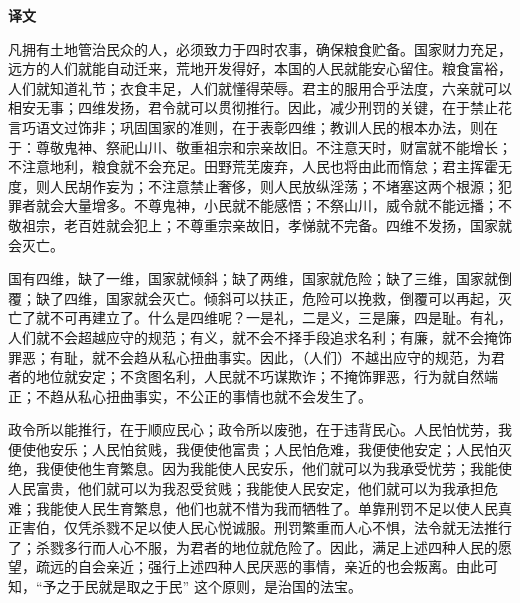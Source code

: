 \documentclass[12pt,UTF-8,openany,a4]{ctexbook}
\begin{document}
\newpage

\begin{Large}
    \noindent\textbf{译文}
\end{Large}


\vspace{1em}

\begin{large}
    \yiwen 
    凡拥有土地管治民众的人，必须致力于四时农事，确保粮食贮备。国家财力充足，远方的人们就能自动迁来，荒地开发得好，本国的人民就能安心留住。粮食富裕，人们就知道礼节；衣食丰足，人们就懂得荣辱。君主的服用合乎法度，六亲就可以相安无事；四维发扬，君令就可以贯彻推行。因此，减少刑罚的关键，在于禁止花言巧语文过饰非；巩固国家的准则，在于表彰四维；教训人民的根本办法，则在于：尊敬鬼神、祭祀山川、敬重祖宗和宗亲故旧。不注意天时，财富就不能增长；不注意地利，粮食就不会充足。田野荒芜废弃，人民也将由此而惰怠；君主挥霍无度，则人民胡作妄为；不注意禁止奢侈，则人民放纵淫荡；不堵塞这两个根源；犯罪者就会大量增多。不尊鬼神，小民就不能感悟；不祭山川，威令就不能远播；不敬祖宗，老百姓就会犯上；不尊重宗亲故旧，孝悌就不完备。四维不发扬，国家就会灭亡。
    
    国有四维，缺了一维，国家就倾斜；缺了两维，国家就危险；缺了三维，国家就倒覆；缺了四维，国家就会灭亡。倾斜可以扶正，危险可以挽救，倒覆可以再起，灭亡了就不可再建立了。什么是四维呢？一是礼，二是义，三是廉，四是耻。有礼，人们就不会超越应守的规范；有义，就不会不择手段追求名利；有廉，就不会掩饰罪恶；有耻，就不会趋从私心扭曲事实。因此，（人们）不越出应守的规范，为君者的地位就安定；不贪图名利，人民就不巧谋欺诈；不掩饰罪恶，行为就自然端正；不趋从私心扭曲事实，不公正的事情也就不会发生了。
    
    政令所以能推行，在于顺应民心；政令所以废弛，在于违背民心。人民怕忧劳，我便使他安乐；人民怕贫贱，我便使他富贵；人民怕危难，我便使他安定；人民怕灭绝，我便使他生育繁息。因为我能使人民安乐，他们就可以为我承受忧劳；我能使人民富贵，他们就可以为我忍受贫贱；我能使人民安定，他们就可以为我承担危难；我能使人民生育繁息，他们也就不惜为我而牺牲了。单靠刑罚不足以使人民真正害伯，仅凭杀戮不足以使人民心悦诚服。刑罚繁重而人心不惧，法令就无法推行了；杀戮多行而人心不服，为君者的地位就危险了。因此，满足上述四种人民的愿望，疏远的自会亲近；强行上述四种人民厌恶的事情，亲近的也会叛离。由此可知，“予之于民就是取之于民” 这个原则，是治国的法宝。
    

\end{large}
\end{document}
